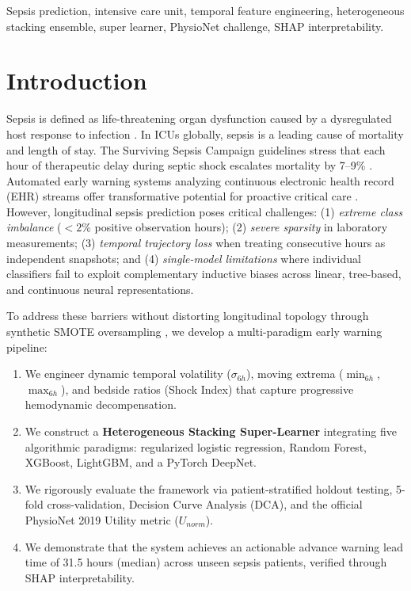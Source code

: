 \documentclass[conference]{IEEEtran}
\begin{document}
\begin{IEEEkeywords}
Sepsis prediction, intensive care unit, temporal feature engineering, heterogeneous stacking ensemble, super learner, PhysioNet challenge, SHAP interpretability.
\end{IEEEkeywords}

\section{Introduction}
Sepsis is defined as life-threatening organ dysfunction caused by a dysregulated host response to infection \cite{singer2016sepsis3}. In ICUs globally, sepsis is a leading cause of mortality and length of stay. The Surviving Sepsis Campaign guidelines stress that each hour of therapeutic delay during septic shock escalates mortality by 7--9\% \cite{evans2021surviving}. Automated early warning systems analyzing continuous electronic health record (EHR) streams offer transformative potential for proactive critical care \cite{reyna2020physionet}. However, longitudinal sepsis prediction poses critical challenges: (1) \textit{extreme class imbalance} ($<2\%$ positive observation hours); (2) \textit{severe sparsity} in laboratory measurements; (3) \textit{temporal trajectory loss} when treating consecutive hours as independent snapshots; and (4) \textit{single-model limitations} where individual classifiers fail to exploit complementary inductive biases across linear, tree-based, and continuous neural representations.

To address these barriers without distorting longitudinal topology through synthetic SMOTE oversampling \cite{chawla2002smote}, we develop a multi-paradigm early warning pipeline:
\begin{enumerate}
    \item We engineer dynamic temporal volatility ($\sigma_{6h}$), moving extrema ($\min_{6h}$, $\max_{6h}$), and bedside ratios (Shock Index) that capture progressive hemodynamic decompensation.
    \item We construct a \textbf{Heterogeneous Stacking Super-Learner} integrating five algorithmic paradigms: regularized logistic regression, Random Forest, XGBoost, LightGBM, and a PyTorch DeepNet.
    \item We rigorously evaluate the framework via patient-stratified holdout testing, 5-fold cross-validation, Decision Curve Analysis (DCA), and the official PhysioNet 2019 Utility metric ($U_{norm}$).
    \item We demonstrate that the system achieves an actionable advance warning lead time of 31.5 hours (median) across unseen sepsis patients, verified through SHAP interpretability.
\end{enumerate}
\end{document}
